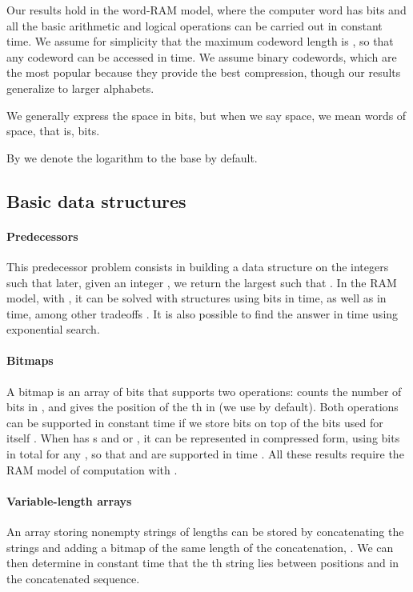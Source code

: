 \documentclass[preprint,12pt]{elsarticle}
\begin{document}
Our results hold in the word-RAM model, where the computer word has  bits 
and all the basic arithmetic and logical operations can be carried out in 
constant time. We assume for simplicity that the maximum codeword length is 
, so that any codeword can be accessed in  time. We assume 
binary codewords, which are the most popular because they provide the best 
compression, though our results generalize to larger alphabets.

We generally express the space in bits, but when we say  space, we
mean  words of space, that is,  bits. 

By  we denote the logarithm to the base  by default.

\subsection{Basic data structures}
\label{sec:basics}

\paragraph{Predecessors}
This predecessor problem consists in building a data structure on the integers
 such that later, given an integer ,
we return the largest  such that . In the RAM model, with
, it can be 
solved with structures using  bits in  time, as 
well as in  time, among other tradeoffs \cite{PT06}. It is 
also possible to find the answer in time  using exponential 
search.

\paragraph{Bitmaps}
A bitmap  is an array of  bits that supports two operations:
 counts the number of bits  in , and 
 gives the position of the th  in  (we use  by
default). Both operations can be supported in constant time if we store  
bits on top of the  bits used for  itself \cite{Cla96,Mun96}. When  
has  s and  or , it can be represented
in compressed form, using  bits in total for any 
, so that  and  are supported in time  \cite{Pat08}.
All these results require the RAM model of computation with .

\paragraph{Variable-length arrays} An array storing  nonempty strings of 
lengths   can be stored by concatenating the strings and 
adding a bitmap of the same
length of the concatenation, .
We can then determine in constant time that
the th string lies between positions  and  
in the concatenated sequence.
\end{document}
